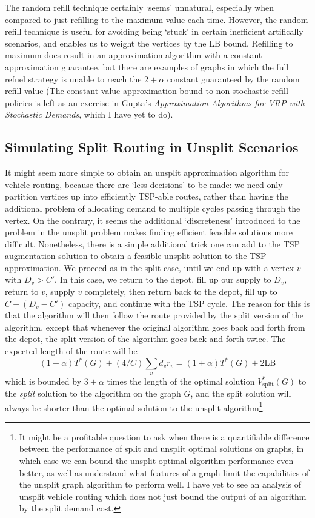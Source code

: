 \documentclass{article}
\theoremstyle{plain}
\newcommand{\VRPsplit}[1]{V^*_{\text{split}}( #1 )}
\begin{document}
The random refill technique certainly `seems' unnatural, especially when compared to just refilling to the maximum value each time. However, the random refill technique is useful for avoiding being `stuck' in certain inefficient artifically scenarios, and enables us to weight the vertices by the $\text{LB}$ bound. Refilling to maximum does result in an approximation algorithm with a constant approximation guarantee, but there are examples of graphs in which the full refuel strategy is unable to reach the $2 + \alpha$ constant guaranteed by the random refill value (The constant value approximation bound to non stochastic refill policies is left as an exercise in  Gupta's {\it Approximation Algorithms for VRP with Stochastic Demands}, which I have yet to do).

\subsection{Simulating Split Routing in Unsplit Scenarios}

It might seem more simple to obtain an unsplit approximation algorithm for vehicle routing, because there are `less decisions' to be made: we need only partition vertices up into efficiently TSP-able routes, rather than having the additional problem of allocating demand to multiple cycles passing through the vertex. On the contrary, it seems the additional `discreteness' introduced to the problem in the unsplit problem makes finding efficient feasible solutions more difficult. Nonetheless, there is a simple additional trick one can add to the TSP augmentation solution to obtain a feasible unsplit solution to the TSP approximation. We proceed as in the split case, until we end up with a vertex $v$ with $D_v > C'$. In this case, we return to the depot, fill up our supply to $D_v$, return to $v$, supply $v$ completely, then return back to the depot, fill up to $C - (D_v - C')$ capacity, and continue with the TSP cycle. The reason for this is that the algorithm will then follow the route provided by the split version of the algorithm, except that whenever the original algorithm goes back and forth from the depot, the split version of the algorithm goes back and forth twice. The expected length of the route will be
%
\[ (1 + \alpha) T^*(G) + (4/C) \sum_v d_v r_v = (1 + \alpha) T^*(G) + 2 \text{LB} \]
%
which is bounded by $3 + \alpha$ times the length of the optimal solution $\VRPsplit{G}$ to the {\it split} solution to the algorithm on the graph $G$, and the split solution will always be shorter than the optimal solution to the unsplit algorithm\footnote{It might be a profitable question to ask when there is a quantifiable difference between the performance of split and unsplit optimal solutions on graphs, in which case we can bound the unsplit optimal algorithm performance even better, as well as understand what features of a graph limit the capabilities of the unsplit graph algorithm to perform well. I have yet to see an analysis of unsplit vehicle routing which does not just bound the output of an algorithm by the split demand cost.}.
\end{document}
